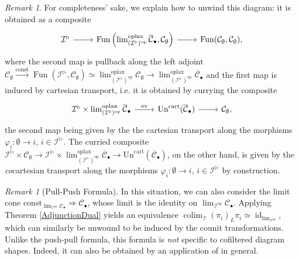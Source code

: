 \documentclass[a4paper,reqno,10pt]{amsart}
\theoremstyle{definition}
\theoremstyle{remark}
\newtheorem{remark}[theorem]{Remark}
\newcommand{\C}{\mathcal{C}}
\newcommand{\I}{\mathcal{I}}
\newcommand{\const}{\mathrm{const}}
\DeclareMathOperator*{\colim}{colim}
\newcommand{\id}{\operatorname{id}}
\newcommand{\ev}{\operatorname{ev}}
\newcommand{\Fun}{\operatorname{Fun}}
\newcommand{\Un}{\mathrm{Un}}
\newcommand{\oplax}{\mathrm{oplax}}
\newcommand{\op}{\mathrm{op}}
\begin{document}
\begin{remark}
For completeness' sake, we explain how to unwind this diagram: it is obtained as a composite
\begin{equation*}
\begin{tikzcd}
\I^{\triangleright}\arrow[r] & \Fun\left(\lim_{(\I^{\triangleright})^{\op}}^{\oplax}\overline{\C}_{\bullet},\C_{\emptyset}\right)\arrow[r] & \Fun(\C_{\emptyset},\C_{\emptyset}),
\end{tikzcd}
\end{equation*}
where the second map is pullback along the left adjoint $\C_{\emptyset}\stackrel{\const}{\rightarrow}\Fun(\I^{\triangleright},\C_{\emptyset})\simeq\lim_{(\I^{\triangleright})^{\op}}^{\oplax}\C_{\emptyset}\rightarrow\lim_{(\I^{\triangleright})^{\op}}^{\oplax}\overline{\C}_{\bullet}$ and the first map is induced by cartesian transport, i.e. it is obtained by currying the composite
\begin{equation*}
\begin{tikzcd}
\I^{\triangleright}\times\lim_{(\I^{\triangleright})^{\op}}^{\oplax}\overline{\C}_{\bullet}\arrow[r,"\ev"] & \Un^{\mathrm{cart}}(\overline{\C}_{\bullet})\arrow[r] & \C_{\emptyset},
\end{tikzcd}
\end{equation*}
the second map being given by the the cartesian transport along the morphisms $\varphi_i\colon\emptyset\rightarrow i,\,i\in\I^{\triangleright}$. The curried composite $\I^{\triangleright}\times\C_{\emptyset}\rightarrow\I^{\triangleright}\times\lim_{(\I^{\triangleright})^{\op}}^{\oplax}\overline{\C}_{\bullet}\rightarrow\Un^{\mathrm{cart}}(\overline{\C}_{\bullet})$, on the other hand, is given by the \textit{co}cartesian transport along the morphisms $\varphi_i\colon\emptyset\rightarrow i,\,i\in\I^{\triangleright}$ by construction.
\end{remark}

\begin{remark}[Pull-Push Formula]
In this situation, we can also consider the limit cone $\const_{\lim_{\I^{\op}}\C_{\bullet}}\Rightarrow\C_{\bullet}$, whose limit is the identity on $\lim_{\I^{\op}}\C_{\bullet}$. Applying Theorem \ref{AdjunctionDual} yields an equivalence $\colim_{\I}(\pi_i)_L\pi_i\simeq\id_{\lim_{\I^{\op}}}$, which can similarly be unwound to be induced by the counit transformations. Unlike the push-pull formula, this formula is \textit{not} specific to cofiltered diagram shapes. Indeed, it can also be obtained by an application of \cite[Corollary 1.3]{HorevYanovski} in general.
\end{remark}
\end{document}
